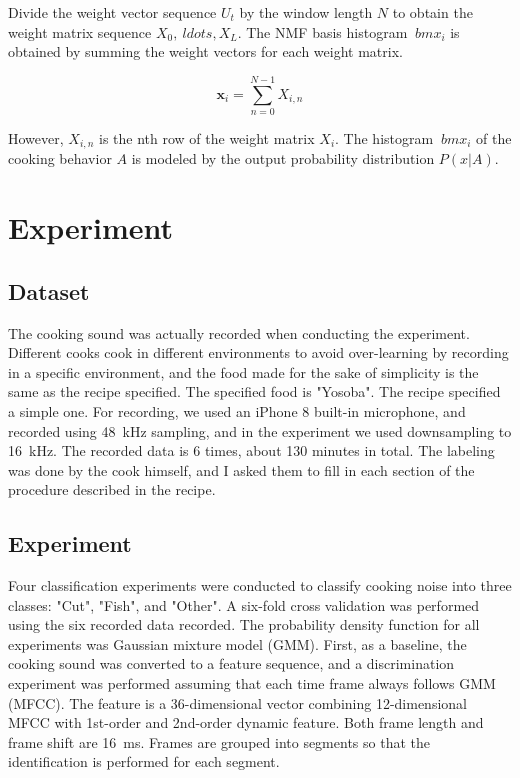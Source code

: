 \documentclass[sigchi]{acmart}
\begin{document}
Divide the weight vector sequence $ {U_t} $ by the window length $ N $ to obtain the weight matrix sequence $ X_0, \ ldots, X_L $.
The NMF basis histogram $ \ bm {x} _i $ is obtained by summing the weight vectors for each weight matrix.

\begin{equation}
\label{hist}
	\bm{x}_i = \sum_{n=0}^{N-1} X_{i, n}
\end{equation}

However, $ X_ {i, n} $ is the nth row of the weight matrix $ X_i $.
The histogram $ \ bm {x} _i $ of the cooking behavior $ A $ is modeled by the output probability distribution $ P (x | A) $.


\section{Experiment}
\subsection{Dataset}
The cooking sound was actually recorded when conducting the experiment. Different cooks cook in different environments to avoid over-learning by recording in a specific environment, and the food made for the sake of simplicity is the same as the recipe specified.
The specified food is "Yosoba". The recipe specified a simple one.
For recording, we used an iPhone 8 built-in microphone, and recorded using \SI{48}{kHz} sampling, and in the experiment we used downsampling to \SI{16}{kHz}. The recorded data is 6 times, about 130 minutes in total.
The labeling was done by the cook himself, and I asked them to fill in each section of the procedure described in the recipe.
\subsection{Experiment}
Four classification experiments were conducted to classify cooking noise into three classes: "Cut", "Fish", and "Other". A six-fold cross validation was performed using the six recorded data recorded. The probability density function for all experiments was Gaussian mixture model (GMM).
First, as a baseline, the cooking sound was converted to a feature sequence, and a discrimination experiment was performed assuming that each time frame always follows GMM (MFCC).
The feature is a 36-dimensional vector combining 12-dimensional MFCC with 1st-order and 2nd-order dynamic feature. Both frame length and frame shift are \SI{16}{ms}. Frames are grouped into segments so that the identification is performed for each segment.
\end{document}
